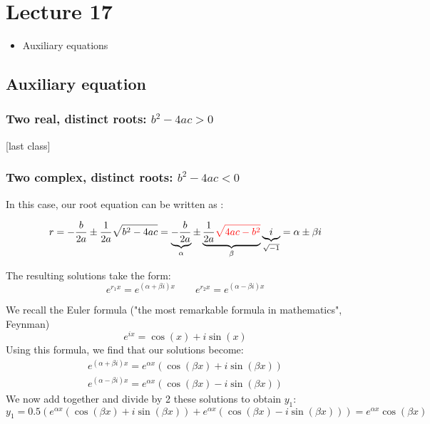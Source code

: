 \chapter*{Lecture 17}
\begin{recall}{}{}
\begin{itemize}
\item Auxiliary equations
\end{itemize}
\end{recall}




\section*{Auxiliary equation} 

\subsection{Two real, distinct roots: $b^2-4ac>0$}
[last class]
\subsection{Two complex, distinct roots: $b^2-4ac<0$}
In this case, our root equation can be written as :

\begin{equation*}
r=-\frac{b}{2a}\pm \frac{1}{2a}\sqrt{b^2-4ac}=\underbrace{-\frac{b}{2a}}_{\alpha}\pm \underbrace{\frac{1}{2a}\textcolor{red}{\sqrt{4ac-b^2}}}_\beta \underbrace{i}_{\sqrt{-1}}=\alpha\pm\beta i
\end{equation*}

The resulting solutions take the form:
\begin{equation*}
e^{r_1x}=e^{(\alpha+\beta i)x} \qquad e^{r_2x}=e^{(\alpha-\beta i)x}
\end{equation*}

We recall the Euler formula ("the most remarkable formula in mathematics", Feynman)
\begin{equation}
e^{ix}=\cos(x)+i \sin(x)
\end{equation}
Using this formula, we find that our solutions become:
\begin{align*}
e^{(\alpha+\beta i)x}=e^{\alpha x}\left(\cos(\beta x)+i\sin(\beta x)\right)\\
e^{(\alpha-\beta i)x}=e^{\alpha x}\left(\cos(\beta x)-i\sin(\beta x)\right)
\end{align*}
We now add together and divide by 2 these solutions to obtain $y_1$:
\begin{equation*}
y_1=0.5(e^{\alpha x}\left(\cos(\beta x)+i\sin(\beta x)\right)+e^{\alpha x}\left(\cos(\beta x)-i\sin(\beta x)\right))=e^{\alpha x}\cos(\beta x)
\end{equation*}

